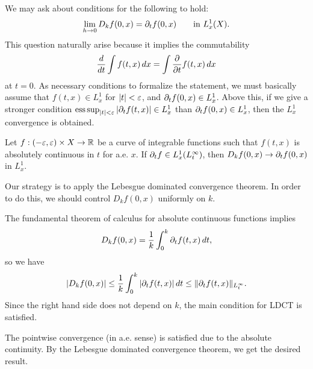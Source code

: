 \documentclass{../exp}
\begin{document}
We may ask about conditions for the following to hold:
\[\lim_{h\to0}D_kf(0,x)=\pd_tf(0,x)\qquad\text{in }L_x^1(X).\]
This question naturally arise because it implies the commutability
\[\dd{t}\int f(t,x)\,dx=\int\pd{t}f(t,x)\,dx\]
at $t=0$.
As necessary conditions to formalize the statement, we must basically assume that $f(t,x)\in L_x^1$ for $|t|<\varepsilon$, and $\pd_tf(0,x)\in L_x^1$.
Above this, if we give a stronger condition $\esssup_{|t|<\e}|\pd_tf(t,x)|\in L_x^1$ than $\pd_tf(0,x)\in L_x^1$, then the $L_x^1$ convergence is obtained.


\begin{thm}
Let $f:(-\e,\e)\times X\to\R$ be a curve of integrable functions such that $f(t,x)$ is absolutely continuous in $t$ for a.e. $x$.
If $\pd_tf\in L_x^1(L_t^\infty)$, then $D_kf(0,x)\to\pd_tf(0,x)$ in $L_x^1$.
\end{thm}
\begin{pf}
Our strategy is to apply the Lebesgue dominated convergence theorem.
In order to do this, we should control $D_kf(0,x)$ uniformly on $k$.

The fundamental theorem of calculus for absolute continuous functions implies
\[D_kf(0,x)=\frac1k\int_0^k\pd_tf(t,x)\,dt,\]
so we have
\[|D_kf(0,x)|\le\frac1k\int_0^k|\pd_tf(t,x)|\,dt\le\|\pd_tf(t,x)\|_{L_t^\infty}.\]
Since the right hand side does not depend on $k$, the main condition for LDCT is satisfied.

The pointwise convergence (in a.e. sense) is satisfied due to the absolute continuity.
By the Lebesgue dominated convergence theorem, we get the desired result.
\end{pf}
\end{document}
